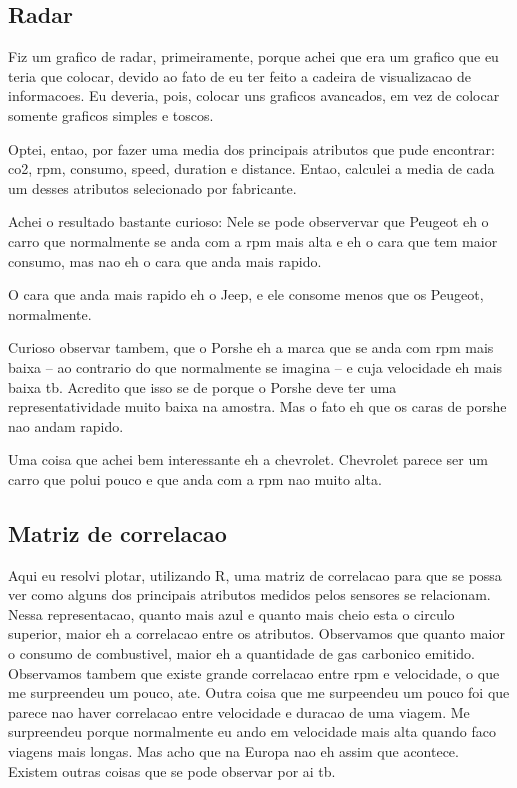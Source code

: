 \documentclass[10pt, conference]{IEEEtran}
\begin{document}
\subsection{Radar}

Fiz um grafico de radar, primeiramente, porque achei que era um grafico que eu teria que colocar, devido
ao fato de eu ter feito a cadeira de visualizacao de informacoes. Eu deveria, pois, colocar uns graficos
avancados, em vez de colocar somente graficos simples e toscos. 

Optei, entao, por fazer uma media dos principais atributos que pude encontrar: co2, rpm, consumo, speed, duration 
e distance. Entao, calculei a media de cada um desses atributos selecionado por fabricante.

Achei o resultado bastante curioso: Nele se pode observervar que Peugeot eh o carro que normalmente se anda com
a rpm mais alta e eh o cara que tem maior consumo, mas nao eh o cara que anda mais rapido. 

O cara que anda mais rapido eh o Jeep, e ele consome menos que os Peugeot, normalmente.

Curioso observar tambem, que o Porshe eh a marca que se anda com rpm mais baixa -- ao contrario do que normalmente
se imagina -- e cuja velocidade eh mais baixa tb. Acredito que isso se de porque o Porshe deve ter uma
representatividade muito baixa na amostra. Mas o fato eh que os caras de porshe nao andam rapido.

Uma coisa que achei bem interessante eh a chevrolet. Chevrolet parece ser um carro que polui pouco e que
anda com a rpm nao muito alta.







\subsection{Matriz de correlacao}

Aqui eu resolvi plotar, utilizando R, uma matriz de correlacao para que se possa ver
como alguns dos principais atributos medidos pelos sensores se relacionam. Nessa
representacao, quanto mais azul e quanto mais cheio esta o circulo superior, maior
eh a correlacao entre os atributos. Observamos que quanto maior o consumo de combustivel,
maior eh a quantidade de gas carbonico emitido. Observamos tambem que existe grande
correlacao entre rpm e velocidade, o que me surpreendeu um pouco, ate. Outra coisa
que me surpeendeu um pouco foi que parece nao haver correlacao entre velocidade e duracao
de uma viagem. Me surpreendeu porque normalmente eu ando em velocidade mais alta quando
faco viagens mais longas. Mas acho que na Europa nao eh assim que acontece. Existem
outras coisas que se pode observar por ai tb.
\end{document}

